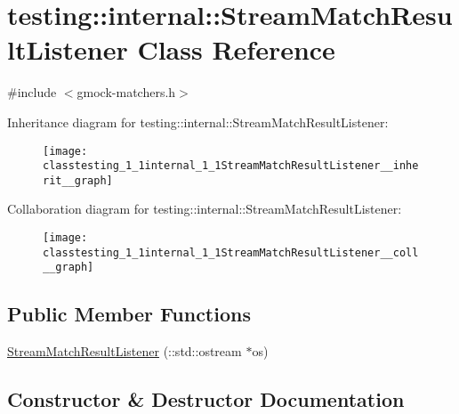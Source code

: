 \hypertarget{classtesting_1_1internal_1_1StreamMatchResultListener}{}\section{testing\+:\+:internal\+:\+:Stream\+Match\+Result\+Listener Class Reference}
\label{classtesting_1_1internal_1_1StreamMatchResultListener}


{\ttfamily \#include $<$gmock-\/matchers.\+h$>$}



Inheritance diagram for testing\+:\+:internal\+:\+:Stream\+Match\+Result\+Listener\+:\nopagebreak
\begin{figure}[H]
\begin{center}
\leavevmode
\texttt{[image: classtesting\_1\_1internal\_1\_1StreamMatchResultListener\_\_inherit\_\_graph]}
\end{center}
\end{figure}


Collaboration diagram for testing\+:\+:internal\+:\+:Stream\+Match\+Result\+Listener\+:\nopagebreak
\begin{figure}[H]
\begin{center}
\leavevmode
\texttt{[image: classtesting\_1\_1internal\_1\_1StreamMatchResultListener\_\_coll\_\_graph]}
\end{center}
\end{figure}
\subsection*{Public Member Functions}
\begin{DoxyCompactItemize}
\item 
\hyperlink{classtesting_1_1internal_1_1StreamMatchResultListener_a81985760741d818745237df002d65d04}{Stream\+Match\+Result\+Listener} (\+::std\+::ostream $\ast$os)
\end{DoxyCompactItemize}


\subsection{Constructor \& Destructor Documentation}
